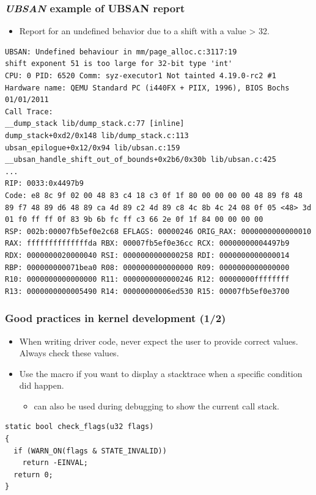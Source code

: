 \begin{frame}[fragile]
  \frametitle{{\em UBSAN} example of UBSAN report}
  \begin{itemize}
    \item Report for an undefined behavior due to a shift with a value > 32.
  \end{itemize}
  \begin{block}{}
    \begin{verbatim}
UBSAN: Undefined behaviour in mm/page_alloc.c:3117:19
shift exponent 51 is too large for 32-bit type 'int'
CPU: 0 PID: 6520 Comm: syz-executor1 Not tainted 4.19.0-rc2 #1
Hardware name: QEMU Standard PC (i440FX + PIIX, 1996), BIOS Bochs 01/01/2011
Call Trace:
__dump_stack lib/dump_stack.c:77 [inline]
dump_stack+0xd2/0x148 lib/dump_stack.c:113
ubsan_epilogue+0x12/0x94 lib/ubsan.c:159
__ubsan_handle_shift_out_of_bounds+0x2b6/0x30b lib/ubsan.c:425
...
RIP: 0033:0x4497b9
Code: e8 8c 9f 02 00 48 83 c4 18 c3 0f 1f 80 00 00 00 00 48 89 f8 48
89 f7 48 89 d6 48 89 ca 4d 89 c2 4d 89 c8 4c 8b 4c 24 08 0f 05 <48> 3d
01 f0 ff ff 0f 83 9b 6b fc ff c3 66 2e 0f 1f 84 00 00 00 00
RSP: 002b:00007fb5ef0e2c68 EFLAGS: 00000246 ORIG_RAX: 0000000000000010
RAX: ffffffffffffffda RBX: 00007fb5ef0e36cc RCX: 00000000004497b9
RDX: 0000000020000040 RSI: 0000000000000258 RDI: 0000000000000014
RBP: 000000000071bea0 R08: 0000000000000000 R09: 0000000000000000
R10: 0000000000000000 R11: 0000000000000246 R12: 00000000ffffffff
R13: 0000000000005490 R14: 00000000006ed530 R15: 00007fb5ef0e3700 
    \end{verbatim}
  \end{block}
\end{frame}

\begin{frame}[fragile]
  \frametitle{Good practices in kernel development (1/2)}
  \begin{itemize}
    \item When writing driver code, never expect the user to provide correct
          values. Always check these values.
    \item Use the  macro if you want to display a stacktrace when
      a specific condition did happen.
    \begin{itemize}
      \item {} can also be used during debugging to
        show the current call stack.
    \end{itemize}
  \end{itemize}
  \begin{block}{}
    \begin{verbatim}
static bool check_flags(u32 flags)
{
  if (WARN_ON(flags & STATE_INVALID))
    return -EINVAL;
  return 0;
}
    \end{verbatim}
  \end{block}
\end{frame}


